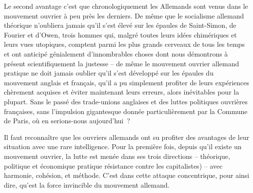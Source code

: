 \documentclass[french,twoside]{book} %
\begin{document}
Le second avantage c’est que chronologiquement les Allemands sont venus dans le mouvement ouvrier à peu près les derniers. De même que le socialisme allemand théorique n’oubliera jamais qu’il s’est élevé sur les épaules de Saint-Simon, de Fourier et d’Owen, trois hommes qui, malgré toutes leurs idées chimériques et leurs vues utopiques, comptent parmi les plus grands cerveaux de tous les temps et ont anticipé génialement d’innombrables choses dont nous démontrons à présent scientifiquement la justesse – de même le mouvement ouvrier allemand pratique ne doit jamais oublier qu’il s’est développé sur les épaules du mouvement anglais et français, qu’il a pu simplement profiter de leurs expériences chèrement acquises et éviter maintenant leurs erreurs, alors inévitables pour la plupart. Sans le passé des trade-unions anglaises et des luttes politiques ouvrières françaises, sans l’impulsion gigantesque donnée particulièrement par la Commune de Paris, où en serions-nous aujourd’hui ?\par
Il faut reconnaître que les ouvriers allemands ont su profiter des avantages de leur situation avec une rare intelligence. Pour la première fois, depuis qu’il existe un mouvement ouvrier, la lutte est menée dans ses trois directions – théorique, politique et économique pratique résistance contre les capitalistes) – avec harmonie, cohésion, et méthode. C’est dans cette attaque concentrique, pour ainsi dire, qu’est la force invincible du mouvement allemand.\par
\end{document}
